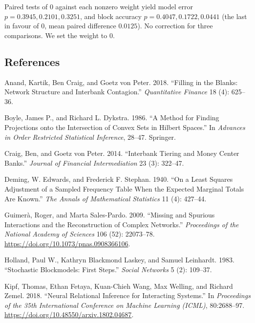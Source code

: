 \documentclass[
  a4paper,
]{article}
\newlength{\cslhangindent}
\newenvironment{CSLReferences}[2] %
 {\begin{list}{}{%
  \setlength{\itemindent}{0pt}
  \setlength{\leftmargin}{0pt}
  \setlength{\parsep}{0pt}
  \ifodd #1
   \setlength{\leftmargin}{\cslhangindent}
   \setlength{\itemindent}{-1\cslhangindent}
  \fi
  \setlength{\itemsep}{#2\baselineskip}}}
 {\end{list}}
\begin{document}
Paired tests of \(0\) against each nonzero weight yield model error
\(p = 0.3945, 0.2101, 0.3251\), and block accuracy
\(p = 0.4047, 0.1722, 0.0441\) (the last in favour of \(0\), mean paired
difference \(0.0125\)). No correction for three comparisons. We set the
weight to \(0\).

\pagebreak

\subsection*{References}\label{references}

\label{refs}
\begin{CSLReferences}{1}{0}
Anand, Kartik, Ben Craig, and Goetz von Peter. 2018. {``Filling in the
Blanks: Network Structure and Interbank Contagion.''} \emph{Quantitative
Finance} 18 (4): 625--36.

Boyle, James P., and Richard L. Dykstra. 1986. {``A Method for Finding
Projections onto the Intersection of Convex Sets in {Hilbert} Spaces.''}
In \emph{Advances in Order Restricted Statistical Inference}, 28--47.
Springer.

Craig, Ben, and Goetz von Peter. 2014. {``Interbank Tiering and Money
Center Banks.''} \emph{Journal of Financial Intermediation} 23 (3):
322--47.

Deming, W. Edwards, and Frederick F. Stephan. 1940. {``On a Least
Squares Adjustment of a Sampled Frequency Table When the Expected
Marginal Totals Are Known.''} \emph{The Annals of Mathematical
Statistics} 11 (4): 427--44.

Guimerà, Roger, and Marta Sales-Pardo. 2009. {``Missing and Spurious
Interactions and the Reconstruction of Complex Networks.''}
\emph{Proceedings of the National Academy of Sciences} 106 (52):
22073--78. \url{https://doi.org/10.1073/pnas.0908366106}.

Holland, Paul W., Kathryn Blackmond Laskey, and Samuel Leinhardt. 1983.
{``Stochastic Blockmodels: First Steps.''} \emph{Social Networks} 5 (2):
109--37.

Kipf, Thomas, Ethan Fetaya, Kuan-Chieh Wang, Max Welling, and Richard
Zemel. 2018. {``Neural Relational Inference for Interacting Systems.''}
In \emph{Proceedings of the 35th International Conference on Machine
Learning (ICML)}, 80:2688--97.
\url{https://doi.org/10.48550/arxiv.1802.04687}.


\end{CSLReferences}
\end{document}
